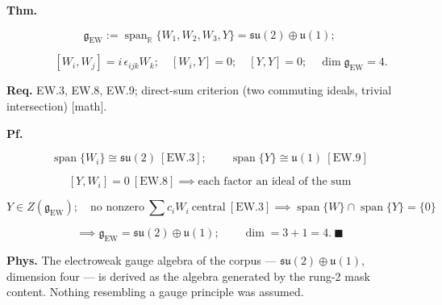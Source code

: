 \begin{theorem}\label{tag:EW-10}
\textbf{Thm.}

\[
\mathfrak g_{\mathrm{EW}}:=\operatorname{span}_{\mathbb R}\{W_1,W_2,W_3,Y\}=\mathfrak{su}(2)\oplus\mathfrak u(1);
\]

\[
\qquad [W_i,W_j]=i\,\epsilon_{ijk}W_k;\quad[W_i,Y]=0;\quad[Y,Y]=0;\quad\dim\mathfrak g_{\mathrm{EW}}=4 .
\]

\textbf{Req.} EW.3, EW.8, EW.9; direct-sum criterion (two commuting ideals, trivial intersection) [math].

\textbf{Pf.}

\[
\operatorname{span}\{W_i\}\cong\mathfrak{su}(2)\ [\mathrm{EW.3}];\qquad\operatorname{span}\{Y\}\cong\mathfrak u(1)\ [\mathrm{EW.9}]
\]

\[
[Y,W_i]=0\ [\mathrm{EW.8}]\implies\text{each factor an ideal of the sum}
\]

\[
Y\in Z(\mathfrak g_{\mathrm{EW}});\quad\text{no nonzero}\ \textstyle\sum c_iW_i\ \text{central}\ [\mathrm{EW.3}]\implies\operatorname{span}\{W\}\cap\operatorname{span}\{Y\}=\{0\}
\]

\[
\implies\mathfrak g_{\mathrm{EW}}=\mathfrak{su}(2)\oplus\mathfrak u(1);\qquad\dim=3+1=4.\ \blacksquare
\]

\textbf{Phys.} The electroweak gauge algebra of the corpus — $\mathfrak{su}(2)\oplus\mathfrak u(1)$, dimension four — is derived as the algebra generated by the rung-2 mask content. Nothing resembling a gauge principle was assumed.

\end{theorem}

